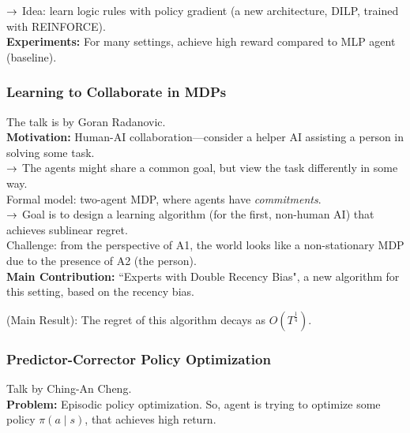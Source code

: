 $\rightarrow$ Idea: learn logic rules with policy gradient (a new architecture, DILP, trained with REINFORCE). \\

{\bf Experiments:} For many settings, achieve high reward compared to MLP agent (baseline). \\

\spacerule

\subsubsection{Learning to Collaborate in MDPs~\cite{radanovic2019learning}}

The talk is by Goran Radanovic. \\

{\bf Motivation:} Human-AI collaboration---consider a helper AI assisting a person in solving some task. \\

$\rightarrow$ The agents might share a common goal, but view the task differently in some way. \\

Formal model: two-agent MDP, where agents have {\it commitments}. \\

$\rightarrow$ Goal is to design a learning algorithm (for the first, non-human AI) that achieves sublinear regret. \\

Challenge: from the perspective of A1, the world looks like a non-stationary MDP due to the presence of A2 (the person). \\

{\bf Main Contribution:} ``Experts with Double Recency Bias", a new algorithm for this setting, based on the recency bias. 

\begin{theorem}
(Main Result): The regret of this algorithm decays as $O\left(T^{\frac{1}{4}}\right)$.
\end{theorem}

\spacerule

\subsubsection{Predictor-Corrector Policy Optimization~\cite{cheng2018predictor}}

Talk by Ching-An Cheng. \\

{\bf Problem:} Episodic policy optimization. So, agent is trying to optimize some policy $\pi(a \mid s)$, that achieves high return. \\

